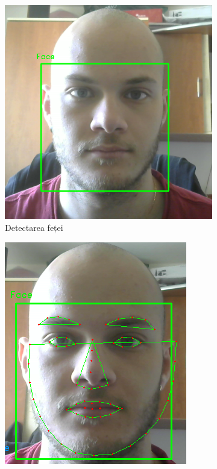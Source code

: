 \documentclass[a4paper, 12pt]{report}
\begin{document}
\begin{itemize}
		\begin{figure}[H]
			\begin{subfigure}[b]{0.5\textwidth}
				\includegraphics[width=\textwidth]{images/face_detected.png}
				\caption{Detectarea feței}
				\label{fig:video_face_detection}
			\end{subfigure}
			\hfill
			\begin{subfigure}[b]{0.425\textwidth}
				\includegraphics[width=\textwidth]{images/face_features.png}

\end{subfigure}
\end{figure}
\end{itemize}
\end{document}
